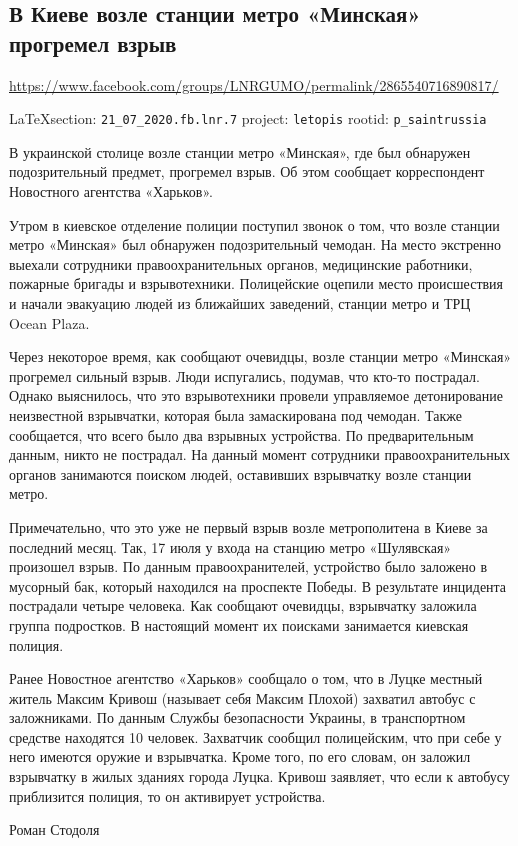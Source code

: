  
 
\subsection{В Киеве возле станции метро «Минская» прогремел взрыв}
\label{sec:21_07_2020.fb.lnr.7}
\url{https://www.facebook.com/groups/LNRGUMO/permalink/2865540716890817/}
  
\vspace{0.5cm}
{\small\LaTeX section: \verb|21_07_2020.fb.lnr.7| project: \verb|letopis| rootid: \verb|p_saintrussia|}
\vspace{0.5cm}

  
В украинской столице возле станции метро «Минская», где был обнаружен
подозрительный предмет, прогремел взрыв. Об этом сообщает корреспондент
Новостного агентства «Харьков». 

Утром в киевское отделение полиции поступил звонок о том, что возле станции
метро «Минская» был обнаружен подозрительный чемодан. На место экстренно
выехали сотрудники правоохранительных органов, медицинские работники, пожарные
бригады и взрывотехники. Полицейские оцепили место происшествия и начали
эвакуацию людей из ближайших заведений, станции метро и ТРЦ Ocean Plaza. 

Через некоторое время, как сообщают очевидцы, возле станции метро «Минская»
прогремел сильный взрыв. Люди испугались, подумав, что кто-то пострадал. Однако
выяснилось, что это взрывотехники провели управляемое детонирование неизвестной
взрывчатки, которая была замаскирована под чемодан. Также сообщается, что всего
было два взрывных устройства. По предварительным данным, никто не пострадал. На
данный момент сотрудники правоохранительных органов занимаются поиском людей,
оставивших взрывчатку возле станции метро. 

Примечательно, что это уже не первый взрыв возле метрополитена в Киеве за
последний месяц. Так, 17 июля у входа на станцию метро «Шулявская» произошел
взрыв. По данным правоохранителей, устройство было заложено в мусорный бак,
который находился на проспекте Победы. В результате инцидента пострадали четыре
человека. Как сообщают очевидцы, взрывчатку заложила группа подростков. В
настоящий момент их поисками занимается киевская полиция. 

Ранее Новостное агентство «Харьков» сообщало о том, что в Луцке местный житель
Максим Кривош (называет себя Максим Плохой) захватил автобус с заложниками. По
данным Службы безопасности Украины, в транспортном средстве находятся 10
человек. Захватчик сообщил полицейским, что при себе у него имеются оружие и
взрывчатка. Кроме того, по его словам, он заложил взрывчатку в жилых зданиях
города Луцка. Кривош заявляет, что если к автобусу приблизится полиция, то он
активирует устройства. 

Роман Стодоля 
